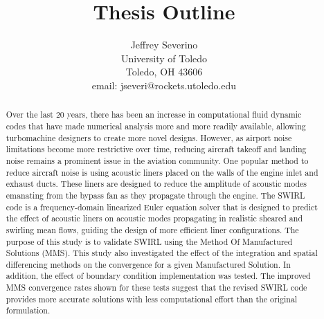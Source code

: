 \documentclass[a4paper]{report}
\begin{document}
\begin{titlepage}
    \title{Thesis Outline}
    \author{ Jeffrey Severino \\
        University of Toledo \\
        Toledo, OH  43606 \\
    email: jseveri@rockets.utoledo.edu}


    \maketitle

\end{titlepage}
\begin{abstract}
   Over the last 20 years, there has been an increase in computational fluid dynamic
   codes that have made numerical analysis more and more readily available, allowing
   turbomachine designers to create more novel designs. However, as airport noise 
   limitations become more restrictive over time, reducing aircraft takeoff and landing noise
   remains a prominent issue in the aviation community. One popular method to reduce
   aircraft noise is using acoustic liners placed on the walls of the engine inlet and
   exhaust ducts. These liners are designed to reduce the amplitude of acoustic modes
   emanating from the bypass fan as they propagate through the engine. The SWIRL
   code is a frequency-domain linearized Euler equation solver that is designed to predict
   the effect of acoustic liners on acoustic modes propagating in realistic sheared and
   swirling mean flows, guiding the design of more efficient liner configurations. 
   The purpose of this study is to validate SWIRL using the Method Of Manufactured Solutions
   (MMS). This study also investigated the effect of the integration and spatial 
   differencing methods on the convergence for a given Manufactured Solution. In addition, the
   effect of boundary condition implementation was tested. The improved MMS convergence 
   rates shown for these tests suggest that the revised SWIRL code provides
   more accurate solutions with less computational effort than the original formulation.
\end{abstract}
\end{document}
